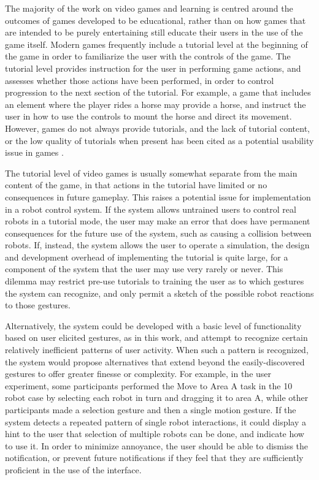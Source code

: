 The majority of the work on video games and learning is centred around the outcomes of games developed to be educational, rather than on how games that are intended to be purely entertaining still educate their users in the use of the game itself.
Modern games frequently include a tutorial level at the beginning of the game in order to familiarize the user with the controls of the game. 
The tutorial level provides instruction for the user in performing game actions, and assesses whether those actions have been performed, in order to control progression to the next section of the tutorial. 
For example, a game that includes an element where the player rides a horse may provide a horse, and instruct the user in how to use the controls to mount the horse and direct its movement. 
However, games do not always provide tutorials, and the lack of tutorial content, or the low quality of tutorials when present has been cited as a potential usability issue in games \citep{pinelle2008heuristic}.

The tutorial level of video games is usually somewhat separate from the main content of the game, in that actions in the tutorial have limited or no consequences in future gameplay. 
This raises a potential issue for implementation in a robot control system. 
If the system allows untrained users to control real robots in a tutorial mode, the user may make an error that does have permanent consequences for the future use of the system, such as causing a collision between robots. 
If, instead, the system allows the user to operate a simulation, the design and development overhead of implementing the tutorial is quite large, for a component of the system that the user may use very rarely or never. 
This dilemma may restrict pre-use tutorials to training the user as to which gestures the system can recognize, and only permit a sketch of the possible robot reactions to those gestures. 

Alternatively, the system could be developed with a basic level of functionality based on user elicited gestures, as in this work, and attempt to recognize certain relatively inefficient patterns of user activity. 
When such a pattern is recognized, the system would propose alternatives that extend beyond the easily-discovered gestures to offer greater finesse or complexity. 
For example, in the user experiment, some participants performed the Move to Area A task in the 10 robot case by selecting each robot in turn and dragging it to area A, while other participants made a selection gesture and then a single motion gesture. 
If the system detects a repeated pattern of single robot interactions, it could display a hint to the user that selection of multiple robots can be done, and indicate how to use it. 
In order to minimize annoyance, the user should be able to dismiss the notification, or prevent future notifications if they feel that they are sufficiently proficient in the use of the interface. 

